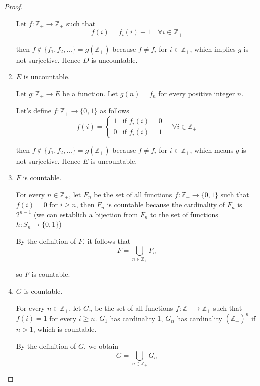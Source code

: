\begin{proof}
\begin{enumerate}[label={(\alph*)}]
              Let $f: \mathbb{Z}_{+}\to \mathbb{Z}_{+}$ such that
              \[
                  f(i) = f_{i}(i) + 1\quad\forall i\in\mathbb{Z}_{+}
              \]

              then $f\notin\{ f_{1}, f_{2}, \ldots \} = g(\mathbb{Z}_{+})$ because $f\ne f_{i}$ for $i\in\mathbb{Z}_{+}$, which implies $g$ is not surjective. Hence $D$ is uncountable.
        \item $E$ is uncountable.

              Let $g: \mathbb{Z}_{+}\to E$ be a function. Let $g(n) = f_{n}$ for every positive integer $n$.

              Let's define $f: \mathbb{Z}_{+}\to \{ 0, 1 \}$ as follows
              \[
                  f(i) = \begin{cases}
                      1 & \text{if $f_{i}(i) = 0$} \\
                      0 & \text{if $f_{i}(i) = 1$}
                  \end{cases}\quad\forall i\in\mathbb{Z}_{+}
              \]

              then $f\notin \{ f_{1}, f_{2}, \ldots \} = g(\mathbb{Z}_{+})$ because $f\ne f_{i}$ for $i\in\mathbb{Z}_{+}$, which means $g$ is not surjective. Hence $E$ is uncountable.
        \item $F$ is countable.

              For every $n\in\mathbb{Z}_{+}$, let $F_{n}$ be the set of all functions $f: \mathbb{Z}_{+}\to \{ 0, 1 \}$ such that $f(i) = 0$ for $i\geq n$, then $F_{n}$ is countable because the cardinality of $F_{n}$ is $2^{n-1}$ (we can establich a bijection from $F_{n}$ to the set of functions $h: S_{n}\to\{0, 1\}$)

              By the definition of $F$, it follows that
              \[
                  F = \bigcup_{n\in\mathbb{Z}_{+}} F_{n}
              \]

              so $F$ is countable.
        \item $G$ is countable.

              For every $n\in\mathbb{Z}_{+}$, let $G_{n}$ be the set of all functions $f: \mathbb{Z}_{+}\to \mathbb{Z}_{+}$ such that $f(i) = 1$ for every $i\geq n$. $G_{1}$ has cardinality $1$, $G_{n}$ has cardinality ${(\mathbb{Z}_{+})}^{n}$ if $n > 1$, which is countable.

              By the definition of $G$, we obtain
              \[
                  G = \bigcup_{n\in\mathbb{Z}_{+}}G_{n}
              \]


\end{enumerate}
\end{proof}
